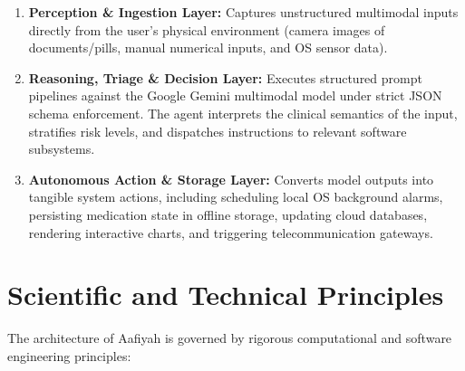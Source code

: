 \documentclass[12pt,a4paper,oneside]{report}
\begin{document}
\begin{enumerate}
    \item \textbf{Perception \& Ingestion Layer:} Captures unstructured multimodal inputs directly from the user's physical environment (camera images of documents/pills, manual numerical inputs, and OS sensor data).
    \item \textbf{Reasoning, Triage \& Decision Layer:} Executes structured prompt pipelines against the Google Gemini multimodal model under strict JSON schema enforcement. The agent interprets the clinical semantics of the input, stratifies risk levels, and dispatches instructions to relevant software subsystems.
    \item \textbf{Autonomous Action \& Storage Layer:} Converts model outputs into tangible system actions, including scheduling local OS background alarms, persisting medication state in offline storage, updating cloud databases, rendering interactive charts, and triggering telecommunication gateways.
\end{enumerate}

\chapter{Scientific and Technical Principles}

The architecture of Aafiyah is governed by rigorous computational and software engineering principles:
\end{document}
